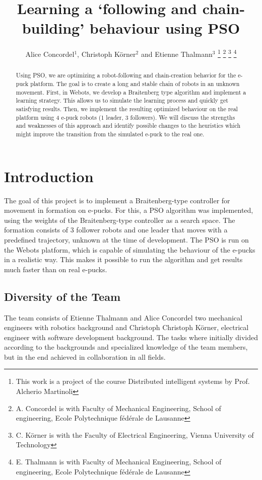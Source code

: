 \documentclass[a4paper, 10pt, conference]{ieeeconf}      %
\title{\LARGE \bf
Learning a `following and chain-building' behaviour using PSO
}
\author{Alice Concordel$^{1}$, Christoph K\"{o}rner$^{2}$ and Etienne Thalmann$^{3}$%
\thanks{This work is a project of the course Distributed intelligent systems by Prof. Alcherio Martinoli}%
\thanks{A. Concordel is with Faculty of Mechanical Engineering, School of engineering, Ecole Polytechnique fédérale de Lausanne}
\thanks{C. K\"{o}rner is with the Faculty of Electrical Engineering, Vienna University of Technology} %
\thanks{E. Thalmann is with Faculty of Mechanical Engineering, School of engineering, Ecole Polytechnique fédérale de Lausanne}%
}
\begin{document}
\maketitle
\thispagestyle{empty}
\pagestyle{empty}


\begin{abstract}
Using PSO, we are optimizing a robot-following and chain-creation behavior for the e-puck platform. The goal is to create a long and stable chain of robots in an unknown movement. First, in Webots, we develop a Braitenberg type algorithm and implement a learning strategy. This allows us to simulate the learning process and quickly get satisfying results. Then, we implement the resulting optimized behaviour on the real platform using 4 e-puck robots (1 leader, 3 followers). We will discuss the strengths and weaknesses of this approach and identify possible changes to the heuristics which might improve the transition from the simulated e-puck to the real one.
\end{abstract}


\section{Introduction}
The goal of this project is to implement a Braitenberg-type controller for movement in formation on e-pucks. For this, a PSO algorithm was implemented, using the weights of the Braitenberg-type controller as a search space. The formation consists of 3 follower robots and one leader that moves with a predefined trajectory, unknown at the time of development. The PSO is run on the Webots platform, which is capable of simulating the behaviour of the e-pucks in a realistic way. This makes it possible to run the algorithm and get results much faster than on real e-pucks.

\subsection{Diversity of the Team}

The team consists of Etienne Thalmann and Alice Concordel two mechanical engineers with robotics background and Christoph Christoph K\"{o}rner, electrical engineer with software development background. The tasks where initially divided according to the backgrounds and specialized knowledge of the team members, but in the end achieved in collaboration in all fields.
\end{document}
